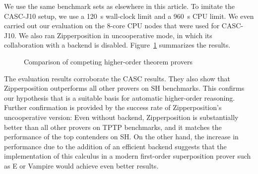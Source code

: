 \documentclass[smallcondensed,draft]{svjour3}     %
\begin{document}
We use the same benchmark sets as elsewhere in this article. To imitate the
CASC-J10 setup, we use a 120~s wall-clock limit and a 960~s CPU limit.
We even carried out our evaluation on the 8-core CPU nodes that were used for
CASC-J10. We also ran Zipperposition in uncooperative mode, in which its
collaboration with a backend is disabled. Figure~\ref{fig:other-provers}
summarizes the results.

\begin{figure}[t]
  \centering
  \def\arraystretch{1.1}%
  \caption{Comparison of competing higher-order theorem provers}
  \label{fig:other-provers}
\end{figure}


The evaluation results corroborate the CASC results. They also
show that Zipperposition outperforms all other provers on SH benchmarks. This
confirms our hypothesis that \lsup{} is a suitable basis for automatic
higher-order reasoning. Further confirmation is provided by the success rate of
Zipperposition's uncooperative version: Even without backend,
Zipperposition is substantially better than all other provers on TPTP
benchmarks, and it matches the performance of the top contenders on SH.
On the other hand, the increase in performance due to the addition
of an efficient backend suggests that the implementation of this calculus in a
modern first-order superposition prover such as E or Vampire would achieve
even better results.
\end{document}
